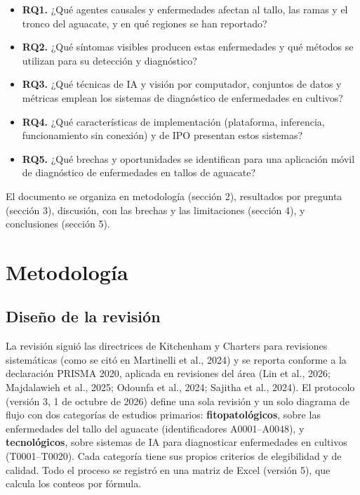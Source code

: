 \documentclass[11pt]{article}
\newcommand{\sangria}{\hspace*{1.27cm}}
\begin{document}
\begin{itemize}

  \item \textbf{RQ1.} ¿Qué agentes causales y enfermedades afectan al tallo, las ramas y el tronco del aguacate, y en qué regiones se han reportado?

  \item \textbf{RQ2.} ¿Qué síntomas visibles producen estas enfermedades y qué métodos se utilizan para su detección y diagnóstico?

  \item \textbf{RQ3.} ¿Qué técnicas de IA y visión por computador, conjuntos de datos y métricas emplean los sistemas de diagnóstico de enfermedades en cultivos?

  \item \textbf{RQ4.} ¿Qué características de implementación (plataforma, inferencia, funcionamiento sin conexión) y de IPO presentan estos sistemas?

  \item \textbf{RQ5.} ¿Qué brechas y oportunidades se identifican para una aplicación móvil de diagnóstico de enfermedades en tallos de aguacate?

\end{itemize}

\sangria El documento se organiza en metodología (sección 2), resultados por pregunta (sección 3), discusión, con las brechas y las limitaciones (sección 4), y conclusiones (sección 5).

\section{Metodología}

\subsection{Diseño de la revisión}

La revisión siguió las directrices de Kitchenham y Charters para revisiones sistemáticas (como se citó en Martinelli et al., 2024) y se reporta conforme a la declaración PRISMA 2020, aplicada en revisiones del área (Lin et al., 2026; Majdalawieh et al., 2025; Odounfa et al., 2024; Sajitha et al., 2024). El protocolo (versión 3, 1 de octubre de 2026) define una sola revisión y un solo diagrama de flujo con dos categorías de estudios primarios: \textbf{fitopatológicos}, sobre las enfermedades del tallo del aguacate (identificadores A0001–A0048), y \textbf{tecnológicos}, sobre sistemas de IA para diagnosticar enfermedades en cultivos (T0001–T0020). Cada categoría tiene sus propios criterios de elegibilidad y de calidad. Todo el proceso se registró en una matriz de Excel (versión 5), que calcula los conteos por fórmula.
\end{document}
